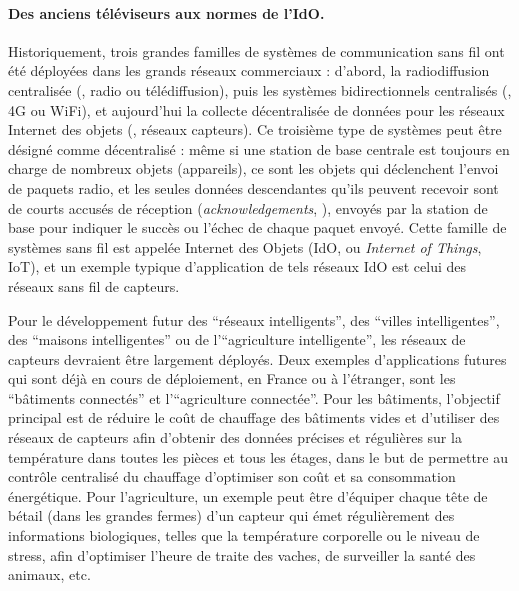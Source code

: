 \begin{resume_fr}
\paragraph{Des anciens téléviseurs aux normes de l'IdO.}
%
Historiquement, trois grandes familles de systèmes de communication sans fil ont été déployées dans les grands réseaux commerciaux : d'abord, la radiodiffusion centralisée (\eg, radio ou télédiffusion), puis les systèmes bidirectionnels centralisés (\eg, 4G ou WiFi), et aujourd'hui la collecte décentralisée de données pour les réseaux Internet des objets (\eg, réseaux capteurs).
%
Ce troisième type de systèmes peut être désigné comme décentralisé :
même si une station de base centrale est toujours en charge de nombreux objets (appareils),
ce sont les objets qui déclenchent l'envoi de paquets radio, et les seules données descendantes qu'ils peuvent recevoir sont de courts accusés de réception (\emph{acknowledgements}, \Ack), envoyés par la station de base pour indiquer le succès ou l'échec de chaque paquet envoyé.
Cette famille de systèmes sans fil est appelée Internet des Objets (IdO, ou \emph{Internet of Things}, IoT),
et un exemple typique d'application de tels réseaux IdO est celui des réseaux sans fil de capteurs.

Pour le développement futur des ``réseaux intelligents'', des ``villes intelligentes'', des ``maisons intelligentes'' ou de l'``agriculture intelligente'', les réseaux de capteurs devraient être largement déployés.
Deux exemples d'applications futures qui sont déjà en cours de déploiement, en France ou à l'étranger, sont les ``bâtiments connectés'' et l'``agriculture connectée''.
Pour les bâtiments, l'objectif principal est de réduire le coût de chauffage des bâtiments vides et d'utiliser des réseaux de capteurs afin d'obtenir des données précises et régulières sur la température dans toutes les pièces et tous les étages, dans le but de permettre au contrôle centralisé du chauffage d'optimiser son coût et sa consommation énergétique.
Pour l'agriculture, un exemple peut être d'équiper chaque tête de bétail (dans les grandes fermes) d'un capteur qui émet régulièrement des informations biologiques, telles que la température corporelle ou le niveau de stress, afin d'optimiser l'heure de traite des vaches, de surveiller la santé des animaux, etc.



\end{resume_fr}
